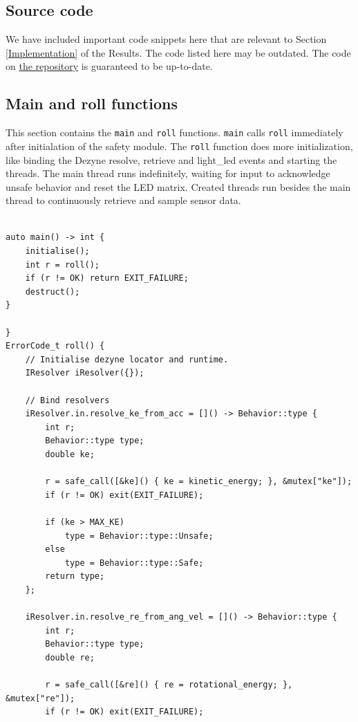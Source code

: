 \documentclass[12pt]{scrreprt}
\begin{document}
\begin{appendices}
\chapter{Source code}
\label{Source code}
We have included important code snippets here that are relevant to Section \ref{Implementation} of the Results. The code listed here may be outdated. The code on \href{https://github.com/Yousousen/safety-module-for-care-robot-rose}{the repository} is guaranteed to be up-to-date.

\section{Main and roll functions}
\label{main and roll}
This section contains the \texttt{main} and \texttt{roll} functions. \texttt{main} calls \texttt{roll} immediately after initialation of the safety module. The \texttt{roll} function does more initialization, like binding the Dezyne resolve, retrieve and light\_led events and starting the threads. The main thread runs indefinitely, waiting for input to acknowledge unsafe behavior and reset the LED matrix. Created threads run besides the main thread to continuously retrieve and sample sensor data.
\begin{verbatim}
               
auto main() -> int {
    initialise();
    int r = roll();
    if (r != OK) return EXIT_FAILURE;
    destruct();
}

}
ErrorCode_t roll() {
    // Initialise dezyne locator and runtime.
    IResolver iResolver({});

    // Bind resolvers
    iResolver.in.resolve_ke_from_acc = []() -> Behavior::type {
        int r;
        Behavior::type type;
        double ke;

        r = safe_call([&ke]() { ke = kinetic_energy; }, &mutex["ke"]);
        if (r != OK) exit(EXIT_FAILURE);

        if (ke > MAX_KE)
            type = Behavior::type::Unsafe;
        else
            type = Behavior::type::Safe;
        return type;
    };

    iResolver.in.resolve_re_from_ang_vel = []() -> Behavior::type {
        int r;
        Behavior::type type;
        double re;

        r = safe_call([&re]() { re = rotational_energy; }, &mutex["re"]);
        if (r != OK) exit(EXIT_FAILURE);


\end{verbatim}
\end{appendices}
\end{document}
